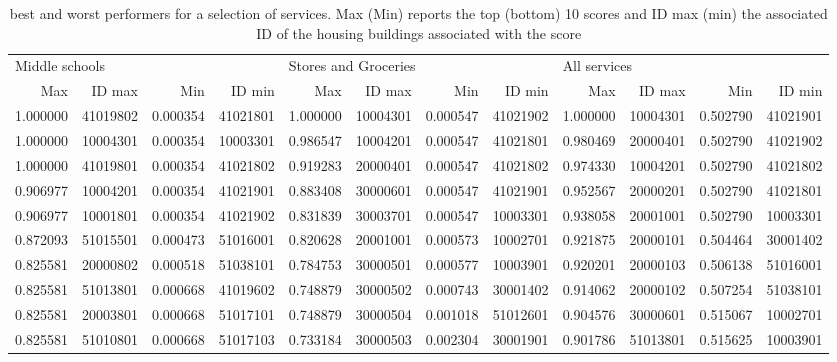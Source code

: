 \documentclass[12pt]{article}
\begin{document}
\begin{landscape}
\begin{table}
			\begin{tabular}{rrrr|rrrr|rrrr}
				\toprule
				\multicolumn{4}{l}{Middle schools} & \multicolumn{4}{l}{Stores and Groceries} & \multicolumn{4}{l}{All services} \\
					 Max &   ID max &      Min &   ID min &      Max &   ID max &      Min &   ID min &      Max &   ID max &      Min &   ID min \\
				\midrule
				1.000000 & 41019802 & 0.000354 & 41021801 & 1.000000 & 10004301 & 0.000547 & 41021902 & 1.000000 & 10004301 & 0.502790 & 41021901 \\
				1.000000 & 10004301 & 0.000354 & 10003301 & 0.986547 & 10004201 & 0.000547 & 41021801 & 0.980469 & 20000401 & 0.502790 & 41021902 \\
				1.000000 & 41019801 & 0.000354 & 41021802 & 0.919283 & 20000401 & 0.000547 & 41021802 & 0.974330 & 10004201 & 0.502790 & 41021802 \\
				0.906977 & 10004201 & 0.000354 & 41021901 & 0.883408 & 30000601 & 0.000547 & 41021901 & 0.952567 & 20000201 & 0.502790 & 41021801 \\
				0.906977 & 10001801 & 0.000354 & 41021902 & 0.831839 & 30003701 & 0.000547 & 10003301 & 0.938058 & 20001001 & 0.502790 & 10003301 \\
				0.872093 & 51015501 & 0.000473 & 51016001 & 0.820628 & 20001001 & 0.000573 & 10002701 & 0.921875 & 20000101 & 0.504464 & 30001402 \\
				0.825581 & 20000802 & 0.000518 & 51038101 & 0.784753 & 30000501 & 0.000577 & 10003901 & 0.920201 & 20000103 & 0.506138 & 51016001 \\
				0.825581 & 51013801 & 0.000668 & 41019602 & 0.748879 & 30000502 & 0.000743 & 30001402 & 0.914062 & 20000102 & 0.507254 & 51038101 \\
				0.825581 & 20003801 & 0.000668 & 51017101 & 0.748879 & 30000504 & 0.001018 & 51012601 & 0.904576 & 30000601 & 0.515067 & 10002701 \\
				0.825581 & 51010801 & 0.000668 & 51017103 & 0.733184 & 30000503 & 0.002304 & 30001901 & 0.901786 & 51013801 & 0.515625 & 10003901 \\
				\bottomrule
				\end{tabular}
	\caption{best and worst performers for a selection of services. Max (Min) reports the top (bottom) 10 scores and ID max (min) the associated ID of the housing buildings associated with the score}
	\label{minmax}
	\end{table}		
			
				
\end{landscape}
\end{document}
